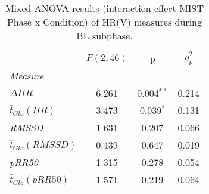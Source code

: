 \begin{table}[th!]
\centering
\caption{Mixed-ANOVA results (interaction effect MIST Phase x Condition) of HR(V) measures during BL subphase.}
\label{tab:cft_mist_interaction}

\begin{tabular}{l||SSS}
\toprule
{} & {$F(2, 46)$} &           {p} & {$\eta^2_p$} \\
\textit{Measure}                &              &               &              \\
\midrule
\textit{$\Delta HR$}            &        6.261 &  0.004$^{**}$ &        0.214 \\
\textit{$\hat{t}_{Glo}(HR)$}    &        3.473 &   0.039$^{*}$ &        0.131 \\
\textit{RMSSD}                  &        1.631 &    0.207$^{}$ &        0.066 \\
\textit{$\hat{t}_{Glo}(RMSSD)$} &        0.439 &    0.647$^{}$ &        0.019 \\
\textit{pRR50}                  &        1.315 &    0.278$^{}$ &        0.054 \\
\textit{$\hat{t}_{Glo}(pRR50)$} &        1.571 &    0.219$^{}$ &        0.064 \\
\bottomrule
\end{tabular}
\end{table}
